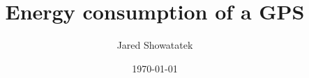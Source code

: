 \newcommand{\mytitle}{Energy consumption of a GPS}
\newcommand{\myauthor}{Jared Showatatek}

\title{\mytitle}
\author{\myauthor}
\date{\today}
